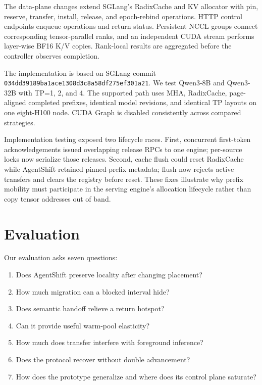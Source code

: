 The data-plane changes extend SGLang's RadixCache and KV allocator with pin, reserve, transfer, install, release, and epoch-rebind operations. HTTP control endpoints enqueue operations and return status. Persistent NCCL groups connect corresponding tensor-parallel ranks, and an independent CUDA stream performs layer-wise BF16 K/V copies. Rank-local results are aggregated before the controller observes completion.

The implementation is based on SGLang commit \texttt{034dd39189ba1ace1308d3c8a58df275ef301a21}. We test Qwen3-8B and Qwen3-32B with TP=1, 2, and 4. The supported path uses MHA, RadixCache, page-aligned completed prefixes, identical model revisions, and identical TP layouts on one eight-H100 node. CUDA Graph is disabled consistently across compared strategies.

Implementation testing exposed two lifecycle races. First, concurrent first-token acknowledgements issued overlapping release RPCs to one engine; per-source locks now serialize those releases. Second, cache flush could reset RadixCache while AgentShift retained pinned-prefix metadata; flush now rejects active transfers and clears the registry before reset. These fixes illustrate why prefix mobility must participate in the serving engine's allocation lifecycle rather than copy tensor addresses out of band.

\section{Evaluation}\label{evaluation}

Our evaluation asks seven questions:

\begin{enumerate}
\def\labelenumi{\arabic{enumi}.}
\tightlist
\item
  Does AgentShift preserve locality after changing placement?
\item
  How much migration can a blocked interval hide?
\item
  Does semantic handoff relieve a return hotspot?
\item
  Can it provide useful warm-pool elasticity?
\item
  How much does transfer interfere with foreground inference?
\item
  Does the protocol recover without double advancement?
\item
  How does the prototype generalize and where does its control plane saturate?
\end{enumerate}

